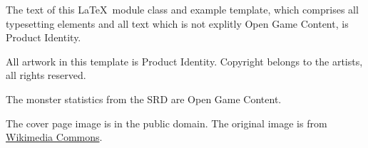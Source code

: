 \documentclass[a4paper,serif]{module}       %
\begin{document}
\begin{productidentity}
\item The text of this \LaTeX~module class and example template, which comprises all typesetting elements and all text which is not explitly Open Game Content, is Product Identity.
\modulecopyright

\item All artwork in this template is Product Identity. Copyright belongs to the artists, all rights reserved.
\end{productidentity}

\begin{opengamecontent}
\item The monster statistics from the SRD are Open Game Content.
\item The cover page image is in the public domain. The original image is from 
\href{https://commons.wikimedia.org/wiki/File:The_Great_Pyramid_and_the_Sphinx.jpg}{Wikimedia Commons}.
\end{opengamecontent}


\tableofcontents

\end{document}
